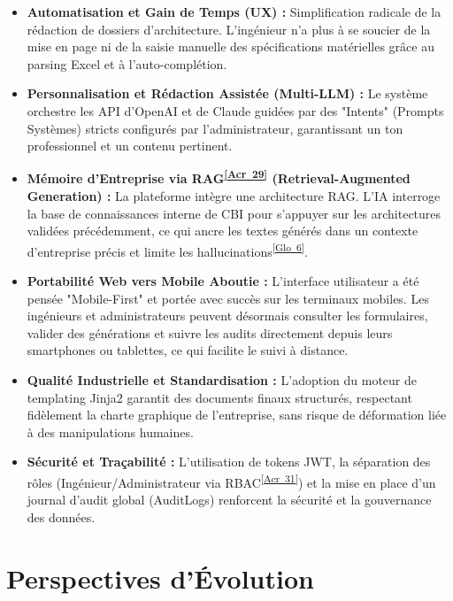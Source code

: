\documentclass[12pt, a4paper]{report}
\newcommand{\acref}[1]{\textsuperscript{\hyperlink{acr:#1}{[Acr~#1]}}}
\newcommand{\gloref}[1]{\textsuperscript{\hyperlink{glo:#1}{[Glo~#1]}}}
\begin{document}
\begin{itemize}
    \item \textbf{Automatisation et Gain de Temps (UX) :} Simplification radicale de la rédaction de dossiers d'architecture. L'ingénieur n'a plus à se soucier de la mise en page ni de la saisie manuelle des spécifications matérielles grâce au parsing Excel et à l'auto-complétion.
    
    \item \textbf{Personnalisation et Rédaction Assistée (Multi-LLM) :} Le système orchestre les API d'OpenAI et de Claude guidées par des "Intents" (Prompts Systèmes) stricts configurés par l'administrateur, garantissant un ton professionnel et un contenu pertinent.
    
    \item \textbf{Mémoire d'Entreprise via RAG\acref{29} (Retrieval-Augmented Generation) :} La plateforme intègre une architecture RAG. L'IA interroge la base de connaissances interne de CBI pour s'appuyer sur les architectures validées précédemment, ce qui ancre les textes générés dans un contexte d'entreprise précis et limite les hallucinations\gloref{6}.
    
    
    
    \item \textbf{Portabilité Web vers Mobile Aboutie :} L'interface utilisateur a été pensée "Mobile-First" et portée avec succès sur les terminaux mobiles. Les ingénieurs et administrateurs peuvent désormais consulter les formulaires, valider des générations et suivre les audits directement depuis leurs smartphones ou tablettes, ce qui facilite le suivi à distance.
    
    \item \textbf{Qualité Industrielle et Standardisation :} L'adoption du moteur de templating Jinja2 garantit des documents finaux structurés, respectant fidèlement la charte graphique de l'entreprise, sans risque de déformation liée à des manipulations humaines.
    
    \item \textbf{Sécurité et Traçabilité :} L'utilisation de tokens JWT, la séparation des rôles (Ingénieur/Administrateur via RBAC\acref{31}) et la mise en place d'un journal d'audit global (AuditLogs) renforcent la sécurité et la gouvernance des données.
\end{itemize}

\section*{Perspectives d’Évolution}
\end{document}
